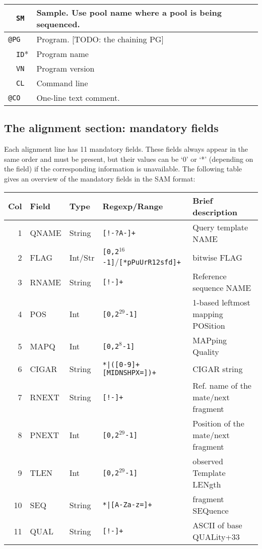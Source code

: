 \documentclass[10pt]{article}
\begin{document}
\begin{center}
\begin{tabular}{|l|l|p{13.5cm}|}
  & {\tt SM} & Sample. Use pool name where a pool is being sequenced.\\\hline
  \multicolumn{2}{|l}{\tt @PG} & Program. [TODO: the chaining PG] \\\cline{2-3}
  & {\tt ID}* & Program name \\\cline{2-3}
  & {\tt VN} & Program version \\\cline{2-3}
  & {\tt CL} & Command line \\\hline
  \multicolumn{2}{|l}{\tt @CO} & One-line text comment.\\
  \hline
\end{tabular}
\end{center}

\subsection{The alignment section: mandatory fields}
Each alignment line has 11 mandatory fields. These fields always appear
in the same order and must be present, but their values can be `0' or
`*' (depending on the field) if the corresponding information is
unavailable. The following table gives an overview of the mandatory
fields in the SAM format:
\begin{center}
\small
\begin{tabular}{rllll}
  \hline
  {\bf Col} & {\bf Field} & {\bf Type} & {\bf Regexp/Range} & {\bf Brief description} \\
  \hline
  1 & {\sf QNAME} & String & {\tt [!-?A-\char126]+} & Query template NAME\\
  2 & {\sf FLAG} & Int/Str & {\tt [0,2$^{16}$-1]}/{\tt [*pPuUrR12sfd]+} & bitwise FLAG \\
  3 & {\sf RNAME} & String & {\tt [!-\char126]+} & Reference sequence NAME\\
  4 & {\sf POS} & Int & {\tt [0,2$^{29}$-1]} & 1-based leftmost mapping POSition \\
  5 & {\sf MAPQ} & Int & {\tt [0,2$^8$-1]} & MAPping Quality \\
  6 & {\sf CIGAR} & String & {\tt \char92*|([0-9]+[MIDNSHPX=])+} & CIGAR string \\
  7 & {\sf RNEXT} & String & {\tt [!-\char126]+} & Ref. name of the mate/next fragment\\
  8 & {\sf PNEXT} & Int & {\tt [0,2$^{29}$-1]} & Position of the mate/next fragment \\
  9 & {\sf TLEN} & Int & {\tt [0,2$^{29}$-1]} & observed Template LENgth \\
  10 & {\sf SEQ} & String & {\tt \char92*|[A-Za-z=]+} & fragment SEQuence\\
  11 & {\sf QUAL} & String & {\tt [!-\char126]+} & ASCII of base QUALity+33 \\
  \hline
\end{tabular}
\end{center}
\end{document}
